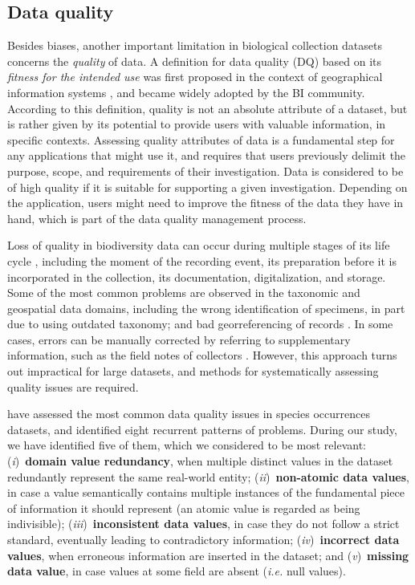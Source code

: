 \subsection{Data quality}
Besides biases, another important limitation in biological collection datasets concerns the \textit{quality} of data.
A definition for data quality (DQ) based on its \textit{fitness for the intended use} was first proposed in the context of geographical information systems \cite{Chrisman1984}, and became widely adopted by the BI community.
According to this definition, quality is not an absolute attribute of a dataset, but is rather given by its potential to provide users with valuable information, in specific contexts.
Assessing quality attributes of data is a fundamental step for any applications that might use it, and requires that users previously delimit the purpose, scope, and requirements of their investigation.
Data is considered to be of high quality if it is suitable for supporting a given investigation.
Depending on the application, users might need to improve the fitness of the data they have in hand, which is part of the data quality management process.

Loss of quality in biodiversity data can occur during multiple stages of its life cycle \cite{Chapman2005}, including the moment of the recording event, its preparation before it is incorporated in the collection, its documentation, digitalization, and storage.
Some of the most common problems are observed in the taxonomic and geospatial data domains, including the wrong identification of specimens, in part due to using outdated taxonomy; and bad georreferencing of records \cite{Soberon2004}.
In some cases, errors can be manually corrected by referring to supplementary information, such as the field notes of collectors \cite{Graham2004}.
However, this approach turns out impractical for large datasets, and methods for systematically assessing quality issues are required.


 have assessed the most common data quality issues in species occurrences datasets, and identified eight recurrent patterns of problems. %
During our study, we have identified five of them, which we considered to be most relevant:
(\textit{i})~\textbf{domain value redundancy}, when multiple distinct values in the dataset redundantly represent the same real-world entity;
(\textit{ii})~\textbf{non-atomic data values}, in case a value semantically contains multiple instances of the fundamental piece of information it should represent (an atomic value is regarded as being indivisible);
(\textit{iii})~\textbf{inconsistent data values}, in case they do not follow a strict standard, eventually leading to contradictory information;
(\textit{iv})~\textbf{incorrect data values}, when erroneous information are inserted in the dataset; and
(\textit{v})~\textbf{missing data value}, in case values at some field are absent (\textit{i.e.} null values).

